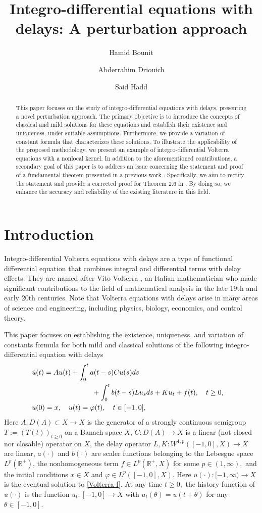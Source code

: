 \documentclass[12pt]{amsart}
\title{Integro-differential equations with delays: A perturbation approach}
\author{Hamid Bounit}
\author{Abderrahim Driouich}
\author{Said Hadd}
\newcommand{\R}{{\mathbb R}}
\theoremstyle{definition}
\theoremstyle{remark}
\theoremstyle{example}
\def\R{\mathbb R}
\begin{document}
\maketitle
\begin{abstract}
This paper focuses on the study of integro-differential equations with delays, presenting a novel perturbation approach. The primary objective is to introduce the concepts of classical and mild solutions for these equations and establish their existence and uniqueness, under suitable assumptions. Furthermore, we provide a variation of constant formula that characterizes these solutions. To illustrate the applicability of the proposed methodology, we present an example of integro-differential Volterra equations with a nonlocal kernel. In addition to the aforementioned contributions, a secondary goal of this paper is to address an issue concerning the statement and proof of a fundamental theorem presented in a previous work \cite{Zaza}. Specifically, we aim to rectify the statement and provide a corrected proof for Theorem 2.6 in \cite{Zaza}. By doing so, we enhance the accuracy and reliability of the existing literature in this field.
\end{abstract}
\section{Introduction}\label{sec:1}
Integro-differential Volterra equations with delays are a type of functional differential equation that combines integral and differential terms with delay effects. They are named after Vito Volterra \cite{Volterra}, an Italian mathematician who made significant contributions to the field of mathematical analysis in the late 19th and early 20th centuries. Note that Volterra equations with delays arise in many areas of science and engineering, including physics, biology, economics, and control theory.

This paper focuses on establishing the existence, uniqueness, and variation of constants formula for both mild and classical solutions of the following integro-differential equation with delays
\begin{align}\label{Volterra-f}
\begin{split}
& \dot{u}(t)=Au(t)+\int^t_0 a(t-s)Cu(s)ds\cr &\hspace{3cm}+\int^t_0 b(t-s)Lu_sds+Ku_t+f(t),\quad t\ge 0,\cr & u(0)=x,\quad u(t)=\varphi(t),\quad t\in [-1,0],
\end{split}
\end{align}
Here $A:D(A)\subset X\to X$ is the generator of a strongly continuous semigroup $T:=(T(t))_{t\ge 0}$ on a Banach space $X$, $C:D(A)\to X$ is a linear (not closed nor closable) operator on $X$, the delay operator $L,K:W^{1,p}([-1,0],X)\to X$ are linear,  $a(\cdot)$ and $b(\cdot)$ are scaler functions belonging to the Lebesgue space $L^{p}(\R^+)$, the nonhomogeneous term $f\in L^p(\R^+,X)$ for some $p\in (1,\infty),$ and the initial conditions $x\in X$ and $\varphi\in L^p([-1,0],X)$.
Here $u(\cdot):[-1,\infty)\to X$ is the eventual solution to \eqref{Volterra-f}. At any time $t\ge 0,$ the history function of $u(\cdot)$  is the function $u_t:[-1,0]\to X$ with $u_t(\theta)=u(t+\theta)$ for any $\theta\in [-1,0]$.
\end{document}
